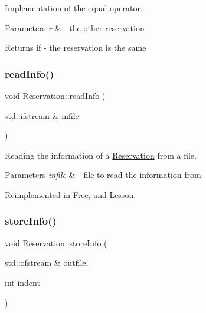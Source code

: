 Implementation of the equal operator. 


\begin{DoxyParams}{Parameters}
{\em r} & -\/ the other reservation \\
\hline
\end{DoxyParams}
\begin{DoxyReturn}{Returns}
if -\/ the reservation is the same 
\end{DoxyReturn}
\mbox{\label{class_reservation_acff32024a350c2156af9f74522c59b7b}} 
\subsubsection{\texorpdfstring{read\+Info()}{readInfo()}}
{\footnotesize\ttfamily void Reservation\+::read\+Info (\begin{DoxyParamCaption}\item[{std\+::ifstream \&}]{infile }\end{DoxyParamCaption})\hspace{0.3cm}{\ttfamily [virtual]}}



Reading the information of a \mbox{\hyperlink{class_reservation}{Reservation}} from a file. 


\begin{DoxyParams}{Parameters}
{\em infile} & -\/ file to read the information from \\
\hline
\end{DoxyParams}


Reimplemented in \mbox{\hyperlink{class_free_ad1023c825c9790edf0797e2e69dd2fcf}{Free}}, and \mbox{\hyperlink{class_lesson_a3ac64e2f79bc9e381634d5d30499e8f1}{Lesson}}.

\mbox{\label{class_reservation_a8ec83fe2eb15294c3a51a9998ed17df7}} 
\subsubsection{\texorpdfstring{store\+Info()}{storeInfo()}}
{\footnotesize\ttfamily void Reservation\+::store\+Info (\begin{DoxyParamCaption}\item[{std\+::ofstream \&}]{outfile,  }\item[{int}]{indent }\end{DoxyParamCaption})\hspace{0.3cm}{\ttfamily [virtual]}}



